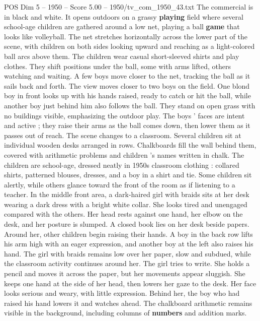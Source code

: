 \begin{textsample}{POS Dim 5 – 1950 – Score 5.00 – 1950/tv\_com\_1950\_43.txt}  \label{ex:f5_pos_079}
The commercial is in black and white.
It opens outdoors on a grassy \textbf{playing} field where several school-age children are gathered around a low net, playing a ball \textbf{game} that looks like volleyball.
The net stretches horizontally across the lower part of the scene, with children on both sides looking upward and reaching as a light-colored ball arcs above them.
The children wear casual short-sleeved shirts and play clothes.
They shift positions under the ball, some with arms lifted, others watching and waiting.
A few boys move closer to the net, tracking the ball as it sails back and forth.
The view moves closer to two boys on the field.
One blond boy in front looks up with his hands raised, ready to catch or hit the ball, while another boy just behind him also follows the ball.
They stand on open grass with no buildings visible, emphasizing the outdoor play.
The boys ’ faces are intent and active ; they raise their arms as the ball comes down, then lower them as it passes out of reach.
The scene changes to a classroom.
Several children sit at individual wooden desks arranged in rows.
Chalkboards fill the wall behind them, covered with arithmetic problems and children ’s names written in chalk.
The children are school-age, dressed neatly in 1950s classroom clothing : collared shirts, patterned blouses, dresses, and a boy in a shirt and tie.
Some children sit alertly, while others glance toward the front of the room as if listening to a teacher.
In the middle front area, a dark-haired girl with braids sits at her desk wearing a dark dress with a bright white collar.
She looks tired and unengaged compared with the others.
Her head rests against one hand, her elbow on the desk, and her posture is slumped.
A closed book lies on her desk beside papers.
Around her, other children begin raising their hands.
A boy in the back row lifts his arm high with an eager expression, and another boy at the left also raises his hand.
The girl with braids remains low over her paper, slow and subdued, while the classroom activity continues around her.
The girl tries to write.
She holds a pencil and moves it across the paper, but her movements appear sluggish.
She keeps one hand at the side of her head, then lowers her gaze to the desk.
Her face looks serious and weary, with little expression.
Behind her, the boy who had raised his hand lowers it and watches ahead.
The chalkboard arithmetic remains visible in the background, including columns of \textbf{numbers} and addition marks.

\end{textsample}
